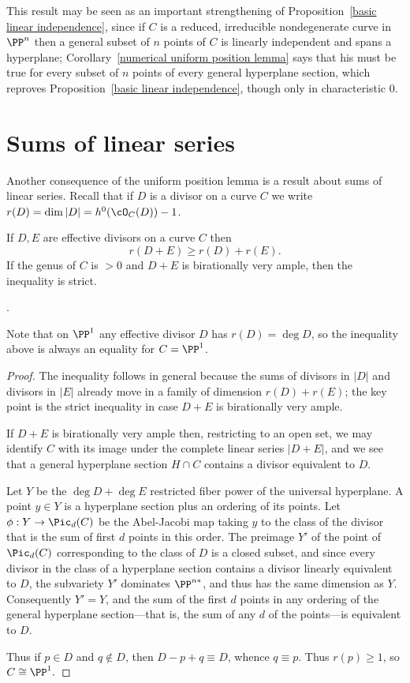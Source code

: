 This result may be seen as an important strengthening of Proposition~\ref{basic linear independence}, since if $C$ is a reduced, irreducible nondegenerate curve in $\PP^n$ then a general subset of $n$ points of $C$ is linearly independent and spans a hyperplane; Corollary~\ref{numerical uniform position lemma} says that his must
be true for every subset of $n$ points of every general hyperplane section, 
which reproves Proposition~\ref{basic linear independence}, though only in characteristic 0. 

\section{Sums of linear series}

Another consequence of the uniform position lemma is a result about sums of linear series.
Recall that if $D$ is a divisor on a curve $C$ we write $r(D) = \dim |D| = h^0(\cO_C(D))-1$.

\begin{corollary}\label{Clifford equality plus}
If $D,E$ are effective divisors on a curve $C$ then
$$
r(D+E) \geq r(D)+r(E).
$$
If the genus of $C$ is $>0$ and $D+E$ is birationally very ample, then the inequality is strict.
\end{corollary}.

Note that on $\PP^1$ any effective divisor $D$ has $r(D) = \deg D$, so the inequality above is
always an equality for $C = \PP^1$.

\begin{proof}
 The inequality follows in general because the sums of divisors in $|D|$ and divisors in $|E|$ already move in 
 a family of dimension $r(D)+r(E)$; the key point is the strict inequality in case $D+E$ is birationally very ample.
 
If $D+E$ is birationally very ample then, restricting to an open set,
we may identify $C$ with its image under the complete linear series $|D+E|$, and we see that a general hyperplane section $H\cap C$ contains a divisor equivalent to $D$.

Let $Y$ be the $\deg D +\deg E$ restricted fiber power of the universal hyperplane.
A point $y\in Y$ is a hyperplane section plus an ordering of its points.  Let $\phi: Y \to \Pic_d(C)$ be the Abel-Jacobi map taking $y$
 to the class of the divisor that is the sum of first $d$ points in this order. The preimage  $Y'$ of the point of $\Pic_d(C)$ corresponding to the class of $D$ is a closed subset, and
since every divisor in the class of a hyperplane section contains a divisor
linearly equivalent to  $D$, the subvariety $Y'$ dominates $\PP^{n*}$, and thus
has the same dimension as $Y$. Consequently $Y'=Y$, and the sum of the first $d$ points
in any ordering of the general hyperplane section---that is, the sum of any $d$
of the points---is equivalent to $D$.

Thus if $p\in D$ and $q\notin D$, then $D-p+q \equiv D$, whence $q\equiv p$. Thus
$r(p)\geq 1$, so $C\cong \PP^1.$
\end{proof}

